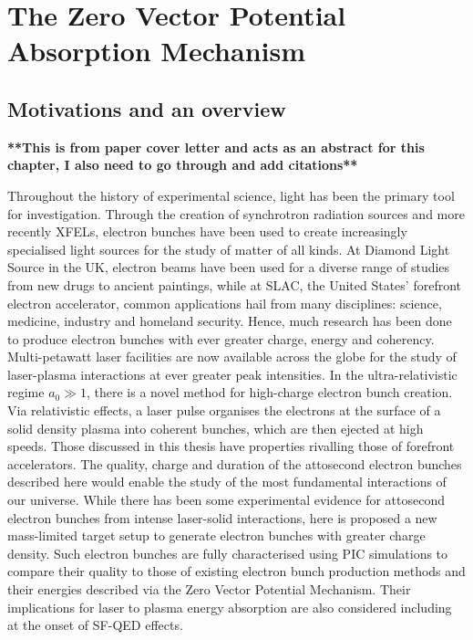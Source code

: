 \chapter{\label{ch:2-zvp}The Zero Vector Potential Absorption Mechanism}

\minitoc
\section{Motivations and an overview}
\textbf{**This is from paper cover letter and acts as an abstract for this chapter, I also need to go through and add citations**}

Throughout the history of experimental science, light has been the primary tool for investigation. Through the creation of synchrotron radiation sources and more recently XFELs, electron bunches have been used to create increasingly specialised light sources for the study of matter of all kinds. At Diamond Light Source in the UK, electron beams have been used for a diverse range of studies from new drugs to ancient paintings, while at SLAC, the United States' forefront electron accelerator, common applications hail from many disciplines: science, medicine, industry and homeland security.  Hence, much research has been done to produce electron bunches with ever greater charge, energy and coherency. Multi-petawatt laser facilities are now available across the globe for the study of laser-plasma interactions at ever greater peak intensities. In the ultra-relativistic regime $a_0 \gg 1$, there is a novel method for high-charge electron bunch creation. Via relativistic effects, a laser pulse organises the electrons at the surface of a solid density plasma into coherent bunches, which are then ejected at high speeds. Those discussed in this thesis have properties rivalling those of forefront accelerators. The quality, charge and duration of the attosecond electron bunches described here would enable the study of the most fundamental interactions of our universe. While there has been some experimental evidence for attosecond electron bunches from intense laser-solid interactions, here is proposed a new mass-limited target setup to generate electron bunches with greater charge density. Such electron bunches are fully characterised using \ac{PIC} simulations to compare their quality to those of existing electron bunch production methods and their energies described via the Zero Vector Potential Mechanism. Their implications for laser to plasma energy absorption are also considered including at the onset of \ac{SF-QED} effects. 

